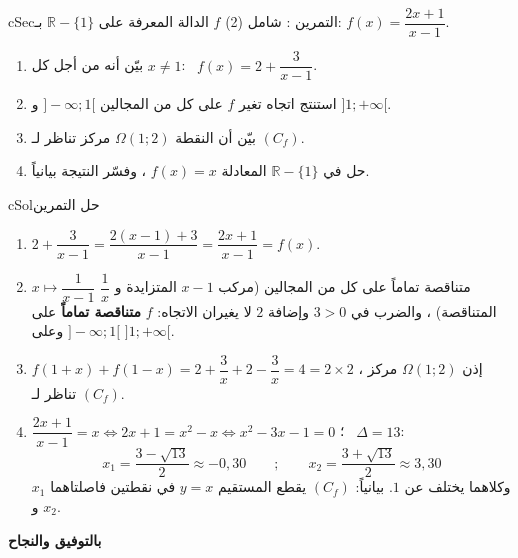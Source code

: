 \documentclass[12pt,a4paper]{article}
\newenvironment{BOX}[2]{\begin{otherlanguage}{english}\begin{arbox}{#1}{#2}}{\end{arbox}\end{otherlanguage}}
\newcounter{exo}
\newenvironment{tamrin}[1]{\stepcounter{exo}\begin{BOX}{cSec}{التمرين \theexo: #1}}{\end{BOX}}
\newenvironment{hal}{\Needspace{12\baselineskip}\begin{otherlanguage}{english}\begin{arbox}[breakable]{cSol}{حل التمرين \theexo}}{\end{arbox}\end{otherlanguage}}
\newcommand{\R}{\mathbb{R}}
\begin{document}
\begin{tamrin}{شامل (2)}
$f$ الدالة المعرفة على $\R-\{1\}$ بـ: $f(x)=\dfrac{2x+1}{x-1}$.
\begin{enumerate}
\item بيّن أنه من أجل كل $x\ne1$: \ $f(x)=2+\dfrac{3}{x-1}$.
\item استنتج اتجاه تغير $f$ على كل من المجالين $]-\infty;1[$ و $]1;+\infty[$.
\item بيّن أن النقطة $\Omega(1;2)$ مركز تناظر لـ $(C_f)$.
\item حل في $\R-\{1\}$ المعادلة $f(x)=x$ ، وفسّر النتيجة بيانياً.
\end{enumerate}
\end{tamrin}
\begin{hal}
\begin{enumerate}
\item $2+\dfrac{3}{x-1}=\dfrac{2(x-1)+3}{x-1}=\dfrac{2x+1}{x-1}=f(x)$.
\item $x\mapsto\dfrac{1}{x-1}$ متناقصة تماماً على كل من المجالين (مركب $x-1$ المتزايدة و $\dfrac1x$ المتناقصة) ،
والضرب في $3>0$ وإضافة $2$ لا يغيران الاتجاه: $f$ \textbf{متناقصة تماماً} على $]-\infty;1[$ وعلى $]1;+\infty[$.
\item $f(1+x)+f(1-x)=2+\dfrac3x+2-\dfrac3x=4=2\times2$ ، إذن $\Omega(1;2)$ مركز تناظر لـ $(C_f)$.
\item $\dfrac{2x+1}{x-1}=x\iff2x+1=x^2-x\iff x^2-3x-1=0$ ؛ \ $\Delta=13$:
\[x_1=\frac{3-\sqrt{13}}{2}\approx-0{,}30\qquad;\qquad x_2=\frac{3+\sqrt{13}}{2}\approx3{,}30\]
وكلاهما يختلف عن $1$. بيانياً: $(C_f)$ يقطع المستقيم $y=x$ في نقطتين فاصلتاهما $x_1$ و $x_2$.
\end{enumerate}
\end{hal}

\vfill
\begin{center}
{\color{cSec}\large\bfseries بالتوفيق والنجاح}
\end{center}
\end{document}
